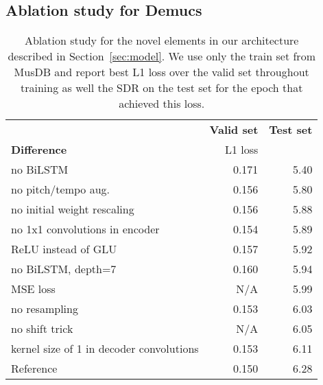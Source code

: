 \subsection{Ablation study for Demucs}
\label{sec:ablation}
\begin{table}
\caption{Ablation study for the novel elements in our architecture described in Section~\ref{sec:model}.
We use only the train set from MusDB and report best L1 loss over the valid set throughout training
as well the SDR on the test set for the epoch that achieved this loss.
}
\label{table:ablation}
\begin{center}
  \setlength\extrarowheight{1pt}
\begin{tabular}{l r r}
  \toprule
  & \textbf{Valid set} & \textbf{Test set}\\
  \textbf{Difference}& L1 loss  & \\
\midrule
  no BiLSTM & 0.171 & 5.40\\
  no pitch/tempo aug. & 0.156 & 5.80 \\
  no initial weight rescaling & 0.156 & 5.88\\
  no 1x1 convolutions in encoder &  0.154 & 5.89 \\
  ReLU instead of GLU &  0.157 & 5.92 \\
  no BiLSTM, depth=7  & 0.160 & 5.94\\
  MSE loss  & N/A & 5.99\\
  no resampling & 0.153 & 6.03 \\
  no shift trick &  N/A & 6.05 \\
  kernel size of 1 in decoder convolutions & 0.153 & 6.11 \\
  \midrule
  Reference & 0.150 & 6.28\\
  \bottomrule
\end{tabular}
\end{center}
\vskip -3mm
\end{table}

